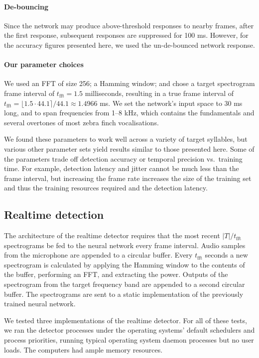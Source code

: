 \documentclass[10pt,letterpaper]{article}
\renewcommand{\subsubsection}[1]{\paragraph{#1}}
\begin{document}
\subsubsection{De-bouncing}

Since the network may produce above-threshold responses to nearby frames, after the first response, subsequent responses are suppressed for 100 ms.  However, for the accuracy figures presented here, we used the un-de-bounced network response.

\subsubsection{Our parameter choices}

We used an FFT of size 256; a Hamming window; and chose a target spectrogram
frame interval of $t_\textrm{fft}=1.5$ milliseconds, resulting in a true frame interval of $t_\textrm{fft}=\lfloor 1.5\cdot 44.1\rceil /44.1\approx 1.4966$ ms.  We set the network's input
space to 30 ms long, and to span frequencies from 1--8 kHz, which
contains the fundamentals and several overtones of most zebra finch
vocalisations.

We found these parameters to work well across a variety of target
syllables, but various other parameter sets yield results similar to those
presented here.  Some of the parameters trade off detection accuracy
or temporal precision vs.~training time. For example, detection latency
and jitter cannot be much less than the frame interval, but increasing the
frame rate increases the size of the training set and thus the
training resources required and the detection latency.

\subsection{Realtime detection}

The architecture of the realtime detector requires that the most
recent $|T|/t_\textrm{fft}$ spectrograms be fed to the neural network every
frame interval.  Audio samples from the microphone
are appended to a circular buffer.  Every $t_\textrm{fft}$ seconds a new
spectrogram is calculated by applying the Hamming window to the
contents of the buffer, performing an FFT, and extracting the
power. Outputs of the spectrogram from the target frequency band are
appended to a second circular buffer.  The spectrograms are sent to a
static implementation of the previously trained neural network.

We tested three implementations of the realtime detector.  For all of
these tests, we ran the detector processes under the operating
systems' default schedulers and process priorities, running typical
operating system daemon processes but no user loads.  The computers
had ample memory resources.
\end{document}
